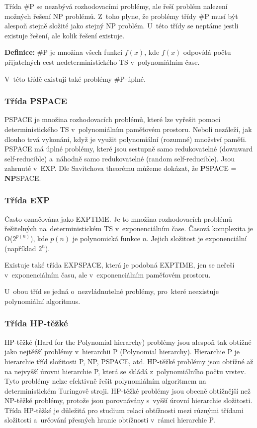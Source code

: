 Třída \#P se nezabývá rozhodovacími problémy, ale řeší problém nalezení možných řešení NP problémů.
Z~toho plyne, že problémy třídy \#P musí být alespoň stejně složité jako stejný NP problém.
U~této třídy se neptáme jestli existuje řešení, ale kolik řešení existuje.

\textbf{Definice:} \#P je množina všech funkcí $f(x)$, kde $f(x)$ odpovídá počtu přijatelných cest nedeterministického TS v~polynomiálním čase.

V~této třídě existují také problémy \#P-úplné.

\subsubsection{Třída PSPACE}

PSPACE je množina rozhodovacích problémů, které lze vyřešit pomocí deterministického TS v~polynomiálním paměťovém prostoru.
Neboli nezáleží, jak dlouho trvá vykonání, když je využit polynomiální (rozumné) množství paměťi.
PSPACE má úplné problémy, které jsou sestupně samo redukovatelné (downward self-reducible) a~náhodně samo redukovatelné (random self-reducible).
Jsou zahrnuté v~EXP.
Dle Savitchova theorému můžeme dokázat, že \textbf{P}SPACE = \textbf{NP}SPACE.

\subsubsection{Třída EXP}

Často označována jako EXPTIME.
Je to množina rozhodovacích problémů řešitelných na~deterministickém TS v~exponenciálním čase.
Časová komplexita je O($2^{p(n)}$), kde $p(n)$ je polynomická funkce $n$.
Jejich složitost je exponenciální (například $2^n$).

Existuje také třída EXPSPACE, která je podobná EXPTIME, jen se neřeší v~exponenciálním času, ale v~exponenciálním paměťovém prostoru.

U~obou tříd se jedná o~nezvládnutelné problémy, pro~které neexistuje polynomiální algoritmus.

\subsubsection{Třída HP-těžké}
HP-těžké (Hard for the Polynomial hierarchy) problémy jsou alespoň tak obtížné jako nejtěžší problémy v~hierarchii P (Polynomial hierarchy).
Hierarchie P je hierarchie tříd složitosti P, NP, PSPACE, atd.
HP-těžké problémy jsou obtížné až na nejvyšší úrovni hierarchie P, která se skládá z~polynomiálního počtu vrstev.
Tyto problémy nelze efektivně řešit polynomiálním algoritmem na deterministickém Turingově stroji.
HP-těžké problémy jsou obecně obtížnější než NP-těžké problémy, protože jsou porovnávány s~vyšší úrovní hierarchie složitosti.
Třída HP-těžké je důležitá pro studium relací obtížnosti mezi různými třídami složitosti a~určování přesných hranic obtížnosti v~rámci hierarchie P.


